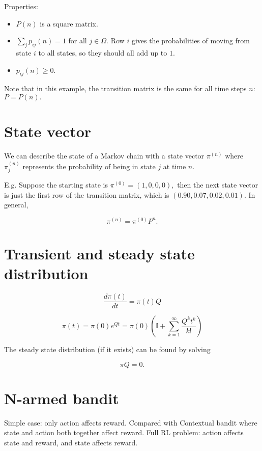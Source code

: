 \documentclass[17pt]{extarticle}
\theoremstyle{plain}
\theoremstyle{definition}
\theoremstyle{remark}
\newcommand{\0}{\varnothing}
\newcommand{\<}{\langle}
\renewcommand{\>}{\rangle}
\begin{document}
Properties:

\begin{itemize}
\item \( P(n) \) is a square matrix.
\item \( \sum_{j} p_{ij} (n) = 1 \) for all \( j \in \Omega. \) Row \( i \) gives the probabilities of moving from state \( i \) to all states, so they should all add up to \( 1. \)
\item \( p_{ij}(n) \geq 0. \)
\end{itemize}


Note that in this example, the transition matrix is the same for all time steps \( n: \) \( P = P(n). \)

\section{State vector}


We can describe the state of a Markov chain with a state vector \( \pi^{(n)} \) where \( \pi^{(n)}_{j} \) represents the probability of being in state \( j \) at time \( n. \)

E.g. Suppose the starting state is \( \pi ^ { ( 0 ) } = ( 1,0,0,0 ), \) then the next state vector is just the first row of the transition matrix, which is \( (0.90, 0.07, 0.02, 0.01). \) In general,

\[
\pi ^ { ( n ) } = \pi ^ { ( 0 ) } P ^ { n }.
\]

\section{Transient and steady state distribution}


\[
\frac { d \pi ( t ) } { d t } = \pi ( t ) Q
\]

\[
\pi ( t ) = \pi ( 0 ) e ^ { Q t } = \pi ( 0 ) \left( \mathbb { I } + \sum _ { k = 1 } ^ { \infty } \frac { Q ^ { k } t ^ { k } } { k ! } \right)
\]

The steady state distribution (if it exists) can be found by solving

\[
\pi Q = 0.
\]


\section{N-armed bandit}


Simple case: only action affects reward. Compared with Contextual bandit where
state and action both together affect reward. Full RL problem: action affects
state and reward, and state affects reward.
\end{document}
